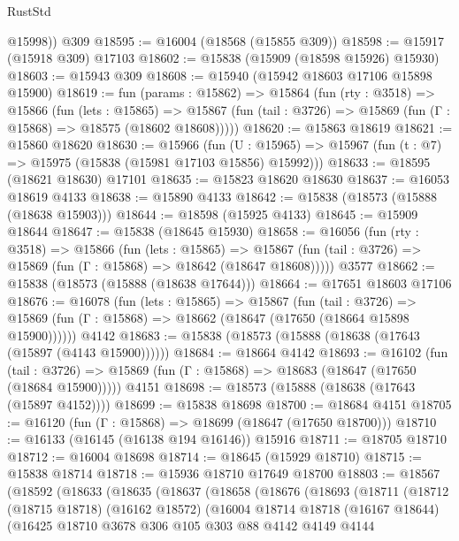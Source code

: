 \begin{lexlean}{RustStd}
\begin{coremodule}
        @15998))
    @309
@18595 := @16004 (@18568 (@15855 @309))
@18598 := @15917 (@15918 @309) @17103
@18602 := @15838 (@15909 (@18598 @15926) @15930)
@18603 := @15943 @309
@18608 := @15940 (@15942 @18603 @17106 @15898 @15900)
@18619 := fun (params : @15862) =>
  @15864
    (fun (rty : @3518) =>
    @15866
      (fun (lets : @15865) =>
      @15867 (fun (tail : @3726) => @15869 (fun (Γ : @15868) => @18575 (@18602 @18608)))))
@18620 := @15863 @18619
@18621 := @15860 @18620
@18630 := @15966
    (fun (U : @15965) => @15967 (fun (t : @7) => @15975 (@15838 (@15981 @17103 @15856) @15992)))
@18633 := @18595 (@18621 @18630) @17101
@18635 := @15823 @18620 @18630
@18637 := @16053 @18619 @4133
@18638 := @15890 @4133
@18642 := @15838 (@18573 (@15888 (@18638 @15903)))
@18644 := @18598 (@15925 @4133)
@18645 := @15909 @18644
@18647 := @15838 (@18645 @15930)
@18658 := @16056
    (fun (rty : @3518) =>
    @15866
      (fun (lets : @15865) =>
      @15867 (fun (tail : @3726) => @15869 (fun (Γ : @15868) => @18642 (@18647 @18608)))))
    @3577
@18662 := @15838 (@18573 (@15888 (@18638 @17644)))
@18664 := @17651 @18603 @17106
@18676 := @16078
    (fun (lets : @15865) =>
    @15867
      (fun (tail : @3726) =>
      @15869 (fun (Γ : @15868) => @18662 (@18647 (@17650 (@18664 @15898 @15900))))))
    @4142
@18683 := @15838 (@18573 (@15888 (@18638 (@17643 (@15897 (@4143 @15900))))))
@18684 := @18664 @4142
@18693 := @16102
    (fun (tail : @3726) => @15869 (fun (Γ : @15868) => @18683 (@18647 (@17650 (@18684 @15900)))))
    @4151
@18698 := @18573 (@15888 (@18638 (@17643 (@15897 @4152))))
@18699 := @15838 @18698
@18700 := @18684 @4151
@18705 := @16120 (fun (Γ : @15868) => @18699 (@18647 (@17650 @18700)))
@18710 := @16133 (@16145 (@16138 @194 @16146)) @15916
@18711 := @18705 @18710
@18712 := @16004 @18698
@18714 := @18645 (@15929 @18710)
@18715 := @15838 @18714
@18718 := @15936 @18710 @17649 @18700
@18803 := @18567
    (@18592
      (@18633
        (@18635
          (@18637
            (@18658
              (@18676
                (@18693
                  (@18711
                    (@18712
                      (@18715 @18718)
                      (@16162 @18572)
                      (@16004
                        @18714
                        @18718
                        (@16167 @18644)
                        (@16425
                          @18710
                          @3678
                          @306
                          @105
                          @303
                          @88
                          @4142
                          @4149
                          @4144

\end{coremodule}
\end{lexlean}
